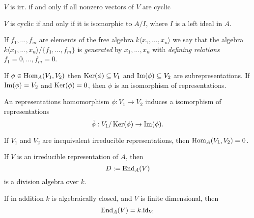 \begin{thm}
$V$ is irr. if and only if all nonzero vectors of $V$ are cyclic
\end{thm}

\begin{thm}
$V$ is cyclic if and only if it is isomorphic to $A/I$, where $I$ is a left ideal in $A$.
\end{thm}

\begin{defn}
If $f_{1},...,f_{m}$ are elements of the free algebra $k\langle x_{1},\ldots ,x_{n}\rangle $ we say that the algebra $k\langle x_{1},...,x_{n}\rangle /\{f_{1},...,f_{m}\}$ is \emph{generated} by $x_{1},...,x_{n}$ with \emph{defining relations} $f_{1}=0,...,f_{m}=0$.
\end{defn}

\begin{thm}
If \(\phi \in \operatorname{Hom}_A(V_{1},V_{2})\) then \(\operatorname{Ker}(\phi )\subseteq V_{1}\) and \(\operatorname{Im}(\phi )\subseteq V_{2}\) are subrepresentations. If \(\operatorname{Im}(\phi )=V_{2}\) and \(\operatorname{Ker}(\phi )=0\), then \(\phi \) is an isomorphism of representations. 
\end{thm}

\begin{thm}
An representations homomorphism \(\phi :V_{1}\rightarrow V_{2}\) induces a isomorphism of representations 
\[\bar{\phi } : V_{1}/\operatorname{Ker}(\phi ) \rightarrow  \operatorname{Im}(\phi ).\]
\end{thm}

\begin{thm}
If \(V_{1}\) and \(V_{2}\) are inequivalent irreducible representations, then \(\operatorname{Hom}_A(V_{1},V_{2})=0\).
\end{thm}

\begin{thm}
If \(V\) is an irreducible representation of \(A\), then 
\[D:=\operatorname{End}_{A} (V)\]
is a division algebra over $k$.   

If in addition \(k\) is algebraically closed, and \(V\) is finite dimensional, then
\[\operatorname{End}_{A} (V) =k.\text{id}_{V.}\]
\end{thm}



